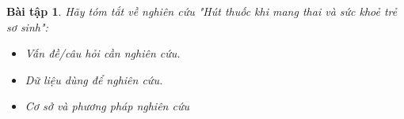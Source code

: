 \documentclass[14pt, a4paper]{article}
\theoremstyle{sltheorem}
\newtheorem{baitap}{Bài tập}
\theoremstyle{soltheorem}
\begin{document}
\begin{titlepage}





    \vfill %

\end{titlepage}

\nocite{*}

\newpage

\begin{baitap}
    Hãy tóm tắt về nghiên cứu "Hút thuốc khi mang thai và sức khoẻ trẻ sơ sinh":
    \begin{itemize}
        \item Vấn đề/câu hỏi cần nghiên cứu.
        \item Dữ liệu dùng để nghiên cứu.
        \item Cơ sở và phương pháp nghiên cứu
    \end{itemize}
\end{baitap}
\end{document}
